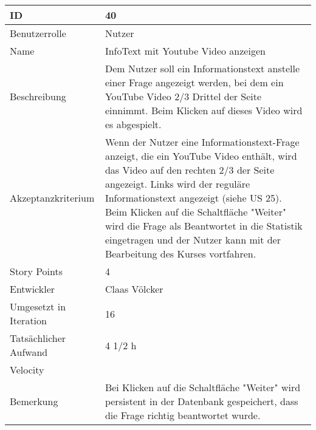 \begin{tabularx}{\textwidth}{|p{}|X|}
	\hline
	ID & 40\\
	\hline
	Benutzerrolle & Nutzer\\
	\hline
	Name & InfoText mit Youtube Video anzeigen\\
	\hline
	Beschreibung & Dem Nutzer soll ein Informationstext anstelle einer Frage angezeigt werden, bei dem ein YouTube Video 2/3 Drittel der Seite einnimmt. Beim Klicken auf dieses Video wird es abgespielt.\\
	\hline
	Akzeptanzkriterium & Wenn der Nutzer eine Informationstext-Frage anzeigt, die ein YouTube Video enthält, wird das Video auf den rechten 2/3 der Seite angezeigt. Links wird der reguläre Informationstext angezeigt (siehe US 25). Beim Klicken auf die Schaltfläche "Weiter" wird die Frage als Beantwortet in die Statistik eingetragen und der Nutzer kann mit der Bearbeitung des Kurses vortfahren.\\
	\hline
	Story Points & 4\\
	\hline
	Entwickler & Claas Völcker\\
	\hline
	Umgesetzt in Iteration & 16\\
	\hline
	Tatsächlicher Aufwand & 4 1/2 h\\
	\hline
	Velocity & \\
	\hline
	Bemerkung & Bei Klicken auf die Schaltfläche "Weiter" wird persistent in der Datenbank gespeichert, dass die Frage richtig beantwortet wurde.\\
	\hline
\end{tabularx}
\vspace{20pt}
